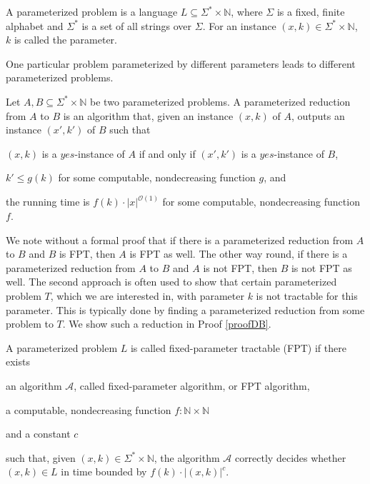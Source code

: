 \begin{definition}
    A parameterized problem is a language $L \subseteq \Sigma^* \times \mathbb{N}$, where
    $\Sigma$ is a fixed, finite alphabet and $\Sigma^*$ is a set of all strings over $\Sigma$.
    For an instance $(x, k) \in \Sigma^* \times \mathbb{N}$, $k$ is called the parameter.
\end{definition}

One particular problem parameterized by different parameters leads to different parameterized problems.

\begin{definition}
    Let $A,B \subseteq \Sigma^* \times \mathbb{N}$ be two parameterized problems.
    A parameterized reduction from $A$ to $B$ is an algorithm that, given an instance $(x, k)$ of $A$,
    outputs an instance $(x', k')$ of $B$ such that
    \begin{description}
        \item $(x, k)$ is a $yes$-instance of $A$ if and only if $(x', k')$ is a $yes$-instance of $B$,
        \item $k' \leq g(k)$ for some computable, nondecreasing function $g$, and
        \item the running time is $f(k) \cdot |x|^{\mathcal{O}(1)}$ for some computable, nondecreasing function $f$.
    \end{description}
\end{definition}

We note without a formal proof that if there is a parameterized reduction from $A$ to $B$ and $B$ is FPT,
then $A$ is FPT as well.
The other way round, if there is a parameterized reduction from $A$ to $B$ and $A$ is not FPT,
then $B$ is not FPT as well.
The second approach is often used to show that certain parameterized problem $T$, which we are interested in,
with parameter $k$ is not tractable for this parameter.
This is typically done by finding a parameterized reduction from some \Wh problem to $T$.
We show such a reduction in Proof \ref{proofDB}.

\begin{definition}[FPT]
    A parameterized problem $L$ is called fixed-parameter tractable (FPT) if there exists
    \begin{description}
        \item an algorithm $\mathcal{A}$, called fixed-parameter algorithm, or FPT algorithm,
        \item a computable, nondecreasing function $f : \mathbb{N} \times \mathbb{N}$
        \item and a constant $c$
    \end{description}
    such that, given $(x,k) \in \Sigma^* \times \mathbb{N}$,
    the algorithm $\mathcal{A}$ correctly decides whether $(x, k) \in L$ in time bounded by
    $f(k) \cdot |(x,k)|^c$.
\end{definition}

